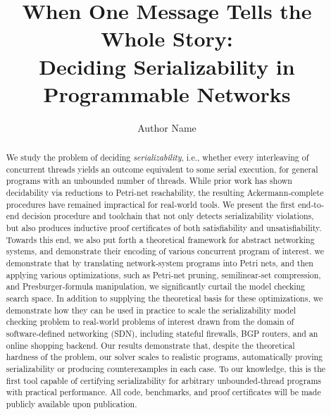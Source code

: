 \documentclass[acmsmall,review,anonymous,nonacm]{acmart}
\title{When One Message Tells the Whole Story:\\ Deciding Serializability in Programmable Networks}
\author{Author Name}
\affiliation{
  \institution{Institution Name}
  \city{City}
  \state{State}
  \country{Country}
}
\let\oldmaketitle\maketitle
\renewcommand{\maketitle}{
  \oldmaketitle
  \pagestyle{plain}  %
  \thispagestyle{plain}  %
}
\begin{document}
\begin{abstract}
	We study the problem of deciding \textit{serializability}, i.e., whether every interleaving of concurrent threads yields an outcome equivalent to some serial execution, for general programs with an unbounded number of threads. While prior work has shown decidability via reductions to Petri‐net reachability, the resulting Ackermann‐complete procedures have remained impractical for real‐world tools. We present the first end‐to‐end decision procedure and toolchain that not only detects serializability violations, but also produces inductive proof certificates of both satisfiability and unsatisfiability. Towards this end, we also put forth a theoretical framework for abstract networking systems, and demonstrate their encoding of various concurrent program of interest. 
	we demonstrate that by translating network‐system programs into Petri nets, and then applying various optimizations, such as Petri‐net pruning, semilinear‐set compression, and Presburger‐formula manipulation, we significantly curtail the model checking search space. 
	In addition to supplying the theoretical basis for these optimizations, we demonstrate how they can be used in practice to scale the serializability model checking problem to real-world problems of interest
	drawn from the domain of software‐defined networking (SDN), including stateful firewalls, BGP routers, and an online shopping backend. Our results demonstrate that, despite the theoretical hardness of the problem, our solver scales to realistic programs, automatically proving serializability or producing counterexamples in each case. To our knowledge, this is the first tool capable of certifying serializability for arbitrary unbounded‐thread programs with practical performance. All code, benchmarks, and proof certificates will be made publicly available upon publication.
\end{abstract}

%	

\maketitle
\end{document}
